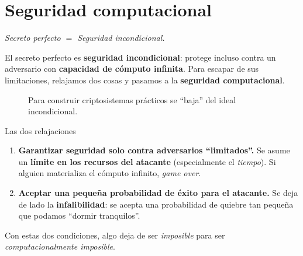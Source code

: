 \documentclass[11pt,a4paper]{article}
\begin{document}
\section{Seguridad computacional}

\begin{center}
\itshape Secreto perfecto $=$ Seguridad incondicional.
\end{center}

El secreto perfecto es \textbf{seguridad incondicional}: protege incluso contra un
adversario con \textbf{capacidad de cómputo infinita}. Para escapar de sus
limitaciones, relajamos dos cosas y pasamos a la \textbf{seguridad computacional}.

\begin{figure}[h]
\centering
{}
\caption{Para construir criptosistemas prácticos se ``baja'' del ideal incondicional.}
\end{figure}

\begin{defbox}{Las dos relajaciones}
\begin{enumerate}[leftmargin=1.5em,itemsep=3pt]
  \item \textbf{Garantizar seguridad solo contra adversarios ``limitados''.} Se asume un
        \textbf{límite en los recursos del atacante} (especialmente el \emph{tiempo}). Si
        alguien materializa el cómputo infinito, \emph{game over}.
  \item \textbf{Aceptar una pequeña probabilidad de éxito para el atacante.} Se deja de
        lado la \textbf{infalibilidad}: se acepta una probabilidad de quiebre tan pequeña
        que podamos ``dormir tranquilos''.
\end{enumerate}
Con estas dos condiciones, algo deja de ser \emph{imposible} para ser
\emph{computacionalmente imposible}.
\end{defbox}
\end{document}
